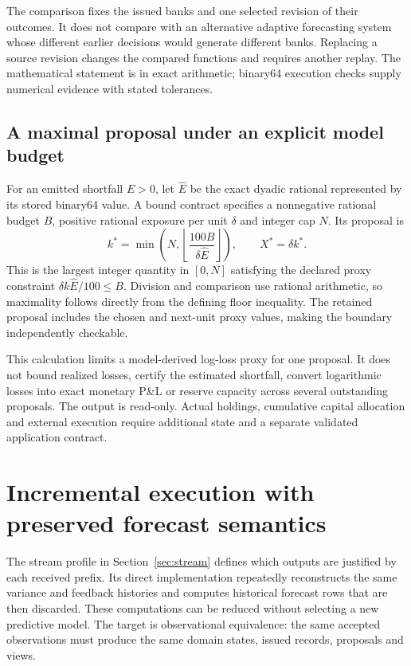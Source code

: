\documentclass[11pt,a4paper]{article}
\theoremstyle{definition}\newtheorem{definition}[theorem]{Definition}
\begin{document}
The comparison fixes the issued banks and one selected revision of their outcomes. It does not compare with an alternative adaptive forecasting system whose different earlier decisions would generate different banks. Replacing a source revision changes the compared functions and requires another replay. The mathematical statement is in exact arithmetic; binary64 execution checks supply numerical evidence with stated tolerances.

\subsection{A maximal proposal under an explicit model budget}
For an emitted shortfall $E>0$, let $\widehat E$ be the exact dyadic rational represented by its stored binary64 value. A bound contract specifies a nonnegative rational budget $B$, positive rational exposure per unit $\delta$ and integer cap $N$. Its proposal is
\begin{equation}
 k^*=\min\left(N,\left\lfloor\frac{100B}{\delta\widehat E}\right\rfloor\right),
 \qquad X^*=\delta k^*.
 \label{eq:streamproposal}
\end{equation}
This is the largest integer quantity in $[0,N]$ satisfying the declared proxy constraint $\delta k\widehat E/100\leq B$. Division and comparison use rational arithmetic, so maximality follows directly from the defining floor inequality. The retained proposal includes the chosen and next-unit proxy values, making the boundary independently checkable.

This calculation limits a model-derived log-loss proxy for one proposal. It does not bound realized losses, certify the estimated shortfall, convert logarithmic losses into exact monetary P\&L or reserve capacity across several outstanding proposals. The output is read-only. Actual holdings, cumulative capital allocation and external execution require additional state and a separate validated application contract.

\section{Incremental execution with preserved forecast semantics}\label{sec:incremental}
The stream profile in Section~\ref{sec:stream} defines which outputs are justified by each received prefix. Its direct implementation repeatedly reconstructs the same variance and feedback histories and computes historical forecast rows that are then discarded. These computations can be reduced without selecting a new predictive model. The target is observational equivalence: the same accepted observations must produce the same domain states, issued records, proposals and views.
\end{document}
